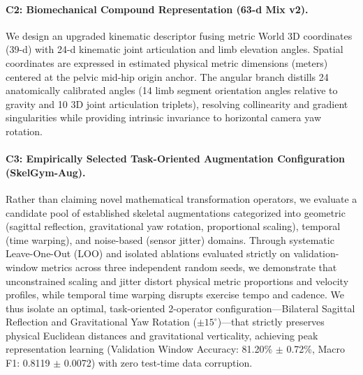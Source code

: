 \documentclass[runningheads]{llncs}
\begin{document}
\paragraph{C2: Biomechanical Compound Representation (63-d Mix v2).} We design an upgraded kinematic descriptor fusing metric World 3D coordinates (39-d) with 24-d kinematic joint articulation and limb elevation angles. Spatial coordinates are expressed in estimated physical metric dimensions (meters) centered at the pelvic mid-hip origin anchor. The angular branch distills 24 anatomically calibrated angles (14 limb segment orientation angles relative to gravity and 10 3D joint articulation triplets), resolving collinearity and gradient singularities while providing intrinsic invariance to horizontal camera yaw rotation.

\paragraph{C3: Empirically Selected Task-Oriented Augmentation Configuration (SkelGym-Aug).} Rather than claiming novel mathematical transformation operators, we evaluate a candidate pool of established skeletal augmentations categorized into geometric (sagittal reflection, gravitational yaw rotation, proportional scaling), temporal (time warping), and noise-based (sensor jitter) domains. Through systematic Leave-One-Out (LOO) and isolated ablations evaluated strictly on validation-window metrics across three independent random seeds, we demonstrate that unconstrained scaling and jitter distort physical metric proportions and velocity profiles, while temporal time warping disrupts exercise tempo and cadence. We thus isolate an optimal, task-oriented 2-operator configuration---Bilateral Sagittal Reflection and Gravitational Yaw Rotation ($\pm 15^\circ$)---that strictly preserves physical Euclidean distances and gravitational verticality, achieving peak representation learning (Validation Window Accuracy: 81.20\% $\pm$ 0.72\%, Macro F1: 0.8119 $\pm$ 0.0072) with zero test-time data corruption.
\end{document}

